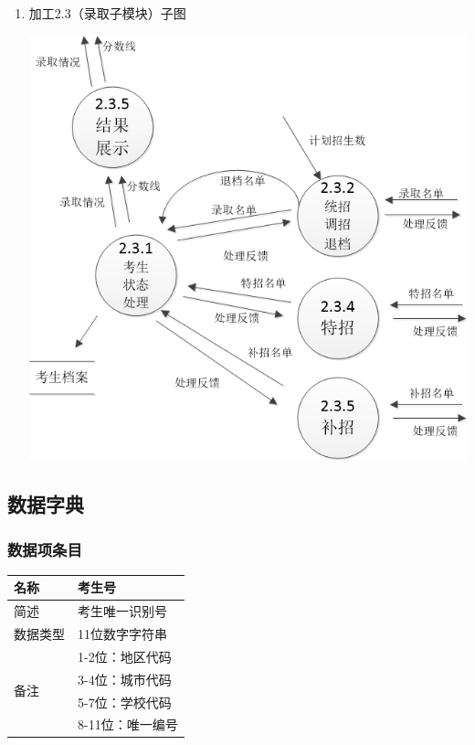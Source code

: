 \documentclass[CJK,utf8]{ctexrep}
\begin{document}
\begin{enumerate}
	\item 加工2.3（录取子模块）子图
	
	\includegraphics[scale=0.65]{DataFlowDiagram/加工2.3子图.png}
\end{enumerate}

\subsection*{数据字典}

%
%

\subsubsection*{数据项条目}

\begin{tabularx}{0.85\textwidth}{|l|X|}
	\hline
	名称 & 考生号 \\
	\hline
	简述 & 考生唯一识别号 \\
	\hline
	数据类型 & 11位数字字符串 \\
	\hline
	\multirow{4}{*}{备注}
	& 1-2位：地区代码 \\
	& 3-4位：城市代码 \\
	& 5-7位：学校代码 \\
	& 8-11位：唯一编号 \\
	\hline
\end{tabularx}
\end{document}
